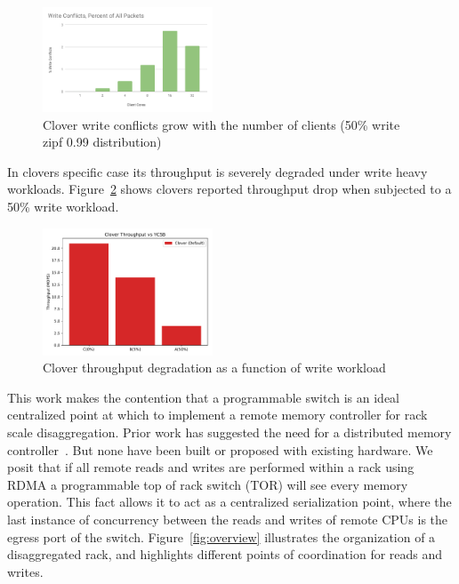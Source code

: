 \begin{figure}
    \includegraphics[width=0.45\textwidth]{fig/write_conflicts.pdf}
    \caption{Clover write conflicts grow with the number of clients
    (50\% write zipf 0.99 distribution)}
    \label{fig:conflicts}
\end{figure}


In clovers specific case its throughput is severely degraded under
write heavy workloads. Figure~\ref{fig:clover_tput} shows clovers
reported throughput drop when subjected to a 50\% write workload.

\begin{figure}
    \includegraphics[width=0.45\textwidth]{fig/clover_tput.pdf}
    \caption{Clover throughput degradation as a function of write
    workload}
    \label{fig:clover_tput}
\end{figure}



This work makes the contention that a programmable switch is an ideal
centralized point at which to implement a remote memory controller
for rack scale disaggregation. Prior work has suggested the need for
a distributed memory controller~\cite{disandapp}. But none have been
built or proposed with existing hardware. We posit that if all remote
reads and writes are performed within a rack using RDMA a programmable
top of rack switch (TOR) will see every memory operation. This fact
allows it to act as a centralized serialization point, where the last
instance of concurrency between the reads and writes of remote CPUs is
the egress port of the switch. Figure~\ref{fig:overview} illustrates
the organization of a disaggregated rack, and highlights different
points of coordination for reads and writes.

